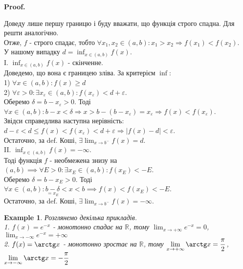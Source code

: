 \documentclass[a4paper, 14pt]{article}
\makeatletter
\def\qed{$\blacksquare$}
\theoremstyle{theoremdd}
\theoremstyle{theoremdd}
\theoremstyle{theoremdd}
\theoremstyle{theoremdd}
\newtheorem{example}[theorem]{Example}
\theoremstyle{theoremdd}
\theoremstyle{theoremdd}
\theoremstyle{theoremdd}
\theoremstyle{theoremdd}
\renewenvironment{proof}[1][Proof.\\]{\par
\pushQED{\hfill \qed}%
\normalfont \topsep6\p@\@plus6\p@\relax
\trivlist
\item\relax
{\bfseries
#1\@addpunct{.}}\hspace\labelsep\ignorespaces
}{%
\popQED\endtrivlist\@endpefalse
}
\makeatother
\begin{document}
\begin{proof}
Доведу лише першу границю і буду вважати, що функція строго спадна. Для решти аналогічно.
\bigskip \\
Отже, $f$ - строго спадає, тобто $\forall x_1,x_2 \in (a,b): x_1>x_2 \Rightarrow f(x_1)<f(x_2)$.\\
У нашому випадку $d = \displaystyle \inf_{x \in (a,b)} f(x)$.\\
I. $\displaystyle\inf_{x \in (a,b)} f(x)$ - скінченне.\\
Доведемо, що вона є границею зліва. За критерієм $\inf$:\\
1) $\forall x \in (a,b): f(x) \geq d$\\
2) $\forall \varepsilon > 0: \exists x_{\varepsilon} \in (a,b): f(x_{\varepsilon})< d + \varepsilon$.\\
Оберемо $\delta = b - x_{\varepsilon} > 0$. Тоді $\forall x \in (a,b): b-x<\delta \Rightarrow x > b - (b-x_{\varepsilon}) = x_{\varepsilon} \Rightarrow f(x) < f(x_\varepsilon)$.\\
Звідси справедлива наступна нерівність:\\
$d - \varepsilon < d \leq f(x) < f(x_\varepsilon) < d + \varepsilon \Rightarrow |f(x)-d| < \varepsilon$.\\
Остаточно, за def. Коші, $\exists \displaystyle \lim_{x \to b^-} f(x) =  d$.
\bigskip \\
II. $\displaystyle\inf_{x \in (a,b)} f(x) = -\infty$.\\
Тоді функція $f$ - необмежена знизу на $(a,b) \implies \forall E>0: \exists x_E \in (a,b): f(x_E) < -E$.\\
Оберемо $\delta = b - x_E > 0$. Тоді $\forall x \in (a,b): \underset{=x_E}{b-\delta} < x < b \implies f(x) < f(x_E) < -E$.\\
Остаточно, за def. Коші, $\exists \displaystyle \lim_{x \to b^-} f(x) = -\infty$.
\end{proof}

\begin{example}
Розглянемо декілька прикладів.\\
1. $f(x) = e^{-x}$ - монотонно спадає на $\mathbb{R}$, тому $\displaystyle\lim_{x \to +\infty} e^{-x} = 0$, $\displaystyle\lim_{x \to -\infty} e^{-x} = +\infty$\\
2. $f(x) = \arctg x$ - монотонно зростає на $\mathbb{R}$, тому $\displaystyle\lim_{x \to +\infty} \arctg x = \dfrac{\pi}{2}$, $\displaystyle\lim_{x \to -\infty} \arctg x = -\dfrac{\pi}{2}$\\
\end{example}
	
\end{document}
